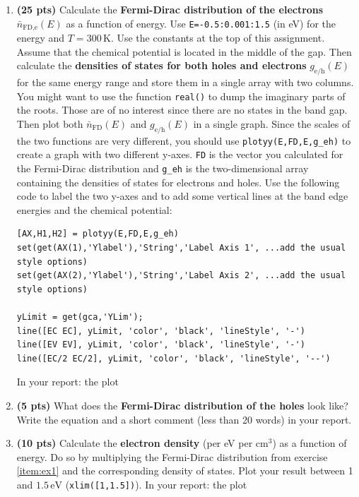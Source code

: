 \documentclass[11pt]{article}
\begin{document}
\begin{enumerate}[resume]
\item\label{item:ex1} \textbf{(25 pts)} Calculate the {\bf Fermi-Dirac distribution of the electrons} $\bar {n}_\text{FD,e}(E)$ as a function of energy. Use \verb|E=-0.5:0.001:1.5| (in eV) for the energy and $T=300\,\mathrm{K}$. Use the constants at the top of this assignment. Assume that the chemical potential is located in the middle of the gap. Then calculate the {\bf densities of states for both holes and electrons} $g_\mathrm{e/h}(E)$ for the same energy range and store them in a single array with two columns. You might want to use the function \verb|real()| to dump the imaginary parts of the roots. Those are of no interest since there are no states in the band gap. Then plot both $\bar {n}_\text{FD}(E)$ and $g_\mathrm{e/h}(E)$ in a single graph. Since the scales of the two functions are very different, you should use \verb|plotyy(E,FD,E,g_eh)| to create a graph with two different y-axes. \verb|FD| is the vector you calculated for the Fermi-Dirac distribution and \verb|g_eh| is the two-dimensional array containing the densities of states for electrons and holes. Use the following code to label the two y-axes and to add some vertical lines at the band edge energies and the chemical potential:
\begin{small}
\begin{verbatim}
[AX,H1,H2] = plotyy(E,FD,E,g_eh)
set(get(AX(1),'Ylabel'),'String','Label Axis 1', ...add the usual style options)
set(get(AX(2),'Ylabel'),'String','Label Axis 2', ...add the usual style options)

yLimit = get(gca,'YLim');
line([EC EC], yLimit, 'color', 'black', 'lineStyle', '-')
line([EV EV], yLimit, 'color', 'black', 'lineStyle', '-')
line([EC/2 EC/2], yLimit, 'color', 'black', 'lineStyle', '--')
\end{verbatim}
\end{small}

{\color{red}In your report: the plot}

\item \label{itm:occhole} \textbf{(5 pts)} What does the {\bf Fermi-Dirac distribution of the holes} look like? Write the {\color{red}equation and a short comment (less than 20 words) in your report}.

\item \label{itm:aa}\textbf{(10 pts)} Calculate the {\bf electron density} (per eV per $\mathrm{cm^3}$) as a function of energy. Do so by multiplying the Fermi-Dirac distribution from exercise \ref{item:ex1} and the corresponding density of states. Plot your result between 1 and $1.5\,\mathrm{eV}$ (\verb|xlim([1,1.5])|). {\color{red}In your report: the plot}


\end{enumerate}
\end{document}
